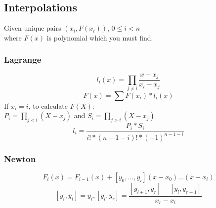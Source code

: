 \subsection{Interpolations}
Given unique pairs $(x_i, F(x_i))$, $0 \le i < n$\\ 
where $F(x)$ is polynomial which you must find.
\subsubsection{Lagrange}
$$l_i(x) = \prod_{j \ne i} \frac{x - x_j}{x_i - x_j}$$
$$F(x) = \sum F(x_i) * l_i(x)$$
If $x_i = i$, to calculate $F(X)$:\\
$P_i = \prod_{j < i} (X - x_j)$ and 
$S_i = \prod_{j > i} (X - x_j)$\\
$$l_i = \frac{P_i * S_i}{i! * (n - 1 - i)! * (-1)^{n - 1 - i}}$$ 
\subsubsection{Newton}
$$F_i(x) = F_{i - 1}(x) + [y_0, \dots, y_i](x - x_0)\dots(x - x_i)$$
$$[y_i, y_i] = y_i, [y_l,y_r] = \frac{[y_{l+1}, y_r] - [y_l, y_{r - 1}]}{x_r - x_l}$$





